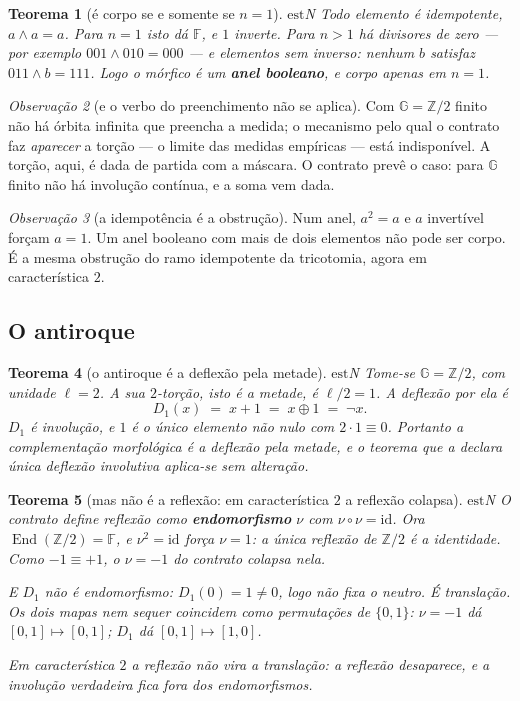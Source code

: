 \documentclass[11pt]{article}
\theoremstyle{plain}
\newtheorem{teorema}{Teorema}
\theoremstyle{remark}
\providecommand{\est}{\ensuremath{\mathrm{est}}}
\providecommand{\FF}{\ensuremath{\mathbb{F}}}
\providecommand{\GG}{\ensuremath{\mathbb{G}}}
\providecommand{\ZZ}{\ensuremath{\mathbb{Z}}}
\newtheorem{observacao}[teorema]{Observação}
\begin{document}
\begin{teorema}[é corpo se e somente se $n=1$]\label{teo:socorpon1}
\est{N} Todo elemento é idempotente, $a\wedge a=a$. Para $n=1$ isto dá $\FF$, e $1$ inverte. Para $n>1$ há
divisores de zero --- por exemplo $001\wedge010=000$ --- e elementos sem inverso: nenhum $b$ satisfaz
$011\wedge b=111$. Logo o mórfico é um \textbf{anel booleano}, e corpo apenas em $n=1$.
\end{teorema}

\begin{observacao}[e o verbo do preenchimento não se aplica]\label{obs:naopreenche}
Com $\GG=\ZZ/2$ finito não há órbita infinita que preencha a medida; o mecanismo pelo qual o contrato faz
\emph{aparecer} a torção --- o limite das medidas empíricas --- está indisponível. A torção, aqui, é dada de
partida com a máscara. O contrato prevê o caso: para $\GG$ finito não há involução contínua, e a soma vem dada.
\end{observacao}

\begin{observacao}[a idempotência é a obstrução]\label{obs:idem}
Num anel, $a^2=a$ e $a$ invertível forçam $a=1$. Um anel booleano com mais de dois elementos não pode ser corpo.
É a mesma obstrução do ramo idempotente da tricotomia, agora em característica $2$.
\end{observacao}

\subsection{O antiroque}

\begin{teorema}[o antiroque é a deflexão pela metade]\label{teo:antiroquemetade}
\est{N} Tome-se $\GG=\ZZ/2$, com unidade $\ell=2$. A sua $2$-torção, isto é a metade, é $\ell/2=1$. A deflexão
por ela é
\[
D_1(x)\;=\;x+1\;=\;x\oplus1\;=\;\neg x.
\]
$D_1$ é involução, e $1$ é o único elemento não nulo com $2\cdot1\equiv0$. Portanto a complementação morfológica
é a deflexão pela metade, e o teorema que a declara única deflexão involutiva aplica-se sem alteração.
\end{teorema}

\begin{teorema}[mas não é a reflexão: em característica $2$ a reflexão colapsa]\label{teo:naoereflexao}
\est{N} O contrato define \emph{reflexão} como \textbf{endomorfismo} $\nu$ com $\nu\circ\nu=\mathrm{id}$. Ora
$\operatorname{End}(\ZZ/2)=\FF$, e $\nu^2=\mathrm{id}$ força $\nu=1$: a única reflexão de $\ZZ/2$ é a
\emph{identidade}. Como $-1\equiv+1$, o $\nu=-1$ do contrato colapsa nela.

\noindent E $D_1$ não é endomorfismo: $D_1(0)=1\neq0$, logo não fixa o neutro. É translação. Os dois mapas nem
sequer coincidem como permutações de $\{0,1\}$: $\nu=-1$ dá $[0,1]\mapsto[0,1]$; $D_1$ dá $[0,1]\mapsto[1,0]$.

\noindent \emph{Em característica $2$ a reflexão não vira a translação: a reflexão desaparece, e a involução
verdadeira fica fora dos endomorfismos.}
\end{teorema}
\end{document}
